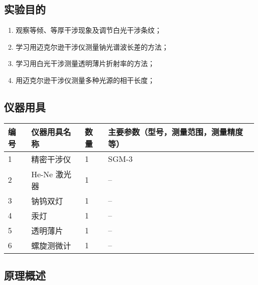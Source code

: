 \documentclass[dvipsnames, svgnames,a4paper,11pt]{article}
\begin{document}
\subsection{实验目的}
\begin{enumerate}
	\item 观察等倾、等厚干涉现象及调节白光干涉条纹；
	\item 学习用迈克尔逊干涉仪测量钠光谱波长差的方法；
	\item 学习用白光干涉测量透明薄片折射率的方法；
	\item 用迈克尔逊干涉仪测量多种光源的相干长度；
	
\end{enumerate}

\subsection{仪器用具}
	\begin{table}[htbp]
		\centering
		\renewcommand\arraystretch{1.6}
		\begin{tabular}{p{}|p{}|p{}|p{}}
			\hline
			编号& 仪器用具名称 & 数量 &  主要参数（型号，测量范围，测量精度等） \\
			\hline
			1& 精密干涉仪 & 1 & SGM-3 \\
			
			2& He-Ne 激光器 & 1 & -- \\
			
			3& 钠钨双灯 & 1 & -- \\
			
			4& 汞灯 & 1 & -- \\
			
			5& 透明薄片 & 1 & -- \\
			
			6& 螺旋测微计 & 1 & -- \\
			\hline
		\end{tabular}
	\end{table}

\subsection{原理概述}
	
\end{document}
